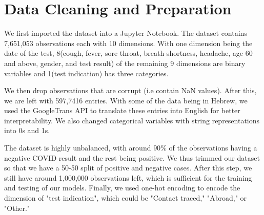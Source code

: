 \documentclass[a4paper, 11pt]{article}
\begin{document}
\section*{Data Cleaning and Preparation}
We first imported the dataset into a Jupyter Notebook. The dataset contains 7,651,053 observations each with 10 dimensions. With one dimension being the date of the test, 8(cough, fever, sore throat, breath shortness, headache, age 60 and above, gender, and test result) of the remaining 9 dimensions are binary variables and 1(test indication) has three categories. \par
We then drop observations that are corrupt (i.e contain NaN values). After this, we are left with 597,7416 entries. With some of the data being in Hebrew, we used the GoogleTrans API to translate these entries into English for better interpretability. We also changed categorical variables with string representations into 0s and 1s. \par
The dataset is highly unbalanced, with around $90\%$ of the observations having a negative COVID result and the rest being positive. We thus trimmed our dataset so that we have a 50-50 split of positive and negative cases. After this step, we still have around 1,000,000 observations left, which is sufficient for the training and testing of our models.
Finally, we used one-hot encoding to encode the dimension of "test indication", which could be "Contact traced," "Abroad," or "Other."
\end{document}
